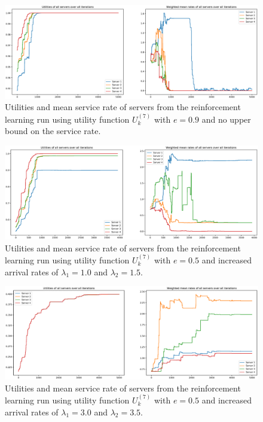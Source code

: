 \begin{figure}[H]
    \includegraphics[width=\textwidth]{chapters/00_appendix/03_more_rl_results/Bin/utility_7_eps/u7_5_no_max_e09.eps}
    \caption{Utilities and mean service rate of servers from the reinforcement
    learning run using utility function \(U_k^{(7)}\) with \(e = 0.9\) and no
    upper bound on the service rate.}
    \label{fig:RL_utility7_5_no_max_e09}
\end{figure}



\begin{figure}[H]
    \includegraphics[width=\textwidth]{chapters/00_appendix/03_more_rl_results/Bin/utility_7_eps/u7_6_e05_Lambda_25.eps}
    \caption{Utilities and mean service rate of servers from the reinforcement
    learning run using utility function \(U_k^{(7)}\) with \(e = 0.5\) and
    increased arrival rates of \(\lambda_1 = 1.0\) and \(\lambda_2 = 1.5\).}
    \label{fig:RL_utility7_6_e05_Lambda_25}
\end{figure}


\begin{figure}[H]
    \includegraphics[width=\textwidth]{chapters/00_appendix/03_more_rl_results/Bin/utility_7_eps/u7_6_e05_Lambda_65.eps}
    \caption{Utilities and mean service rate of servers from the reinforcement
    learning run using utility function \(U_k^{(7)}\) with \(e = 0.5\) and
    increased arrival rates of \(\lambda_1 = 3.0\) and \(\lambda_2 = 3.5\).}
    \label{fig:RL_utility7_6_e05_Lambda_65}
\end{figure}


